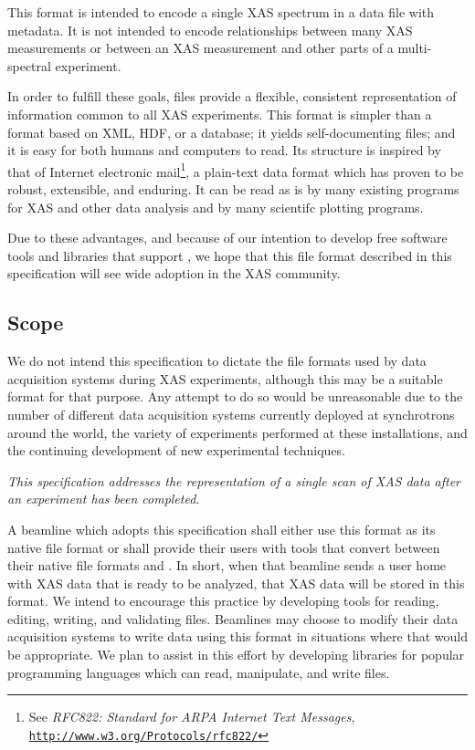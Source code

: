 \documentclass{article}
\begin{document}
This format is intended to encode a single XAS spectrum in a data file
with metadata.  It is not intended to encode relationships between
many XAS measurements or between an XAS measurement and other parts of
a multi-spectral experiment.

In order to fulfill these goals, {\xdi} files provide a flexible,
consistent representation of information common to all XAS
experiments.  This format is simpler than a format based on XML, HDF,
or a database; it yields self-documenting files; and it is easy for
both humans and computers to read.  Its structure is inspired by that
of Internet electronic mail\footnote{See \textit{RFC822: Standard for
    ARPA Internet Text Messages},
  \href{http://www.w3.org/Protocols/rfc822/}
  {\texttt{http://www.w3.org/Protocols/rfc822/}}}, a plain-text data
format which has proven to be robust, extensible, and enduring.  It
can be read as is by many existing programs for XAS and other data
analysis and by many scientifc plotting programs.

Due to these advantages, and because of our intention to develop free
software tools and libraries that support {\xdi}, we hope that this
file format described in this specification will see wide adoption in
the XAS community.



\subsection{Scope}
\label{sec:scope}

We do not intend this specification to dictate the file formats used
by data acquisition systems during XAS experiments, although this may
be a suitable format for that purpose.  Any attempt to do so would be
unreasonable due to the number of different data acquisition systems
currently deployed at synchrotrons around the world, the variety of
experiments performed at these installations, and the continuing
development of new experimental techniques.  

\textit{This specification addresses the representation of a single
  scan of XAS data after an experiment has been completed.}

A beamline which adopts this specification shall either use this
format as its native file format or shall provide their users with
tools that convert between their native file formats and {\xdi}.  In
short, when that beamline sends a user home with XAS data that is
ready to be analyzed, that XAS data will be stored in this format.  We
intend to encourage this practice by developing tools for reading,
editing, writing, and validating {\xdi} files.  Beamlines may choose
to modify their data acquisition systems to write data using this
format in situations where that would be appropriate.  We plan to
assist in this effort by developing libraries for popular programming
languages which can read, manipulate, and write {\xdi} files.
\end{document}
